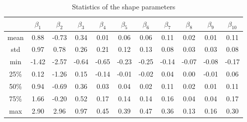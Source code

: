 \begin{table}[h]
    \centering
    \begin{tabular}{c | c c c c c c c c c c}
        \toprule
             & $\beta_1$ & $\beta_2$ & $\beta_3$ & $\beta_4$ & $\beta_5$ & $\beta_6$ & $\beta_7$ & $\beta_8$ & $\beta_9$ & $\beta_{10}$ \\
        \midrule
        mean & 0.88      & -0.73     & 0.34      & 0.01      & 0.06      & 0.06      & 0.11      & 0.02      & 0.01      & 0.11         \\

        std  & 0.97      & 0.78      & 0.26      & 0.21      & 0.12      & 0.13      & 0.08      & 0.03      & 0.03      & 0.08         \\

        min  & -1.42     & -2.57     & -0.64     & -0.65     & -0.23     & -0.25     & -0.14     & -0.07     & -0.08     &
        -0.17                                                                                                                           \\

        25\% & 0.12      & -1.26     & 0.15      & -0.14     & -0.01     & -0.02     & 0.04      & 0.00      & -0.01     & 0.06         \\

        50\% & 0.94      & -0.69     & 0.36      & 0.03      & 0.04      & 0.02      & 0.11      & 0.02      & 0.01      & 0.11         \\

        75\% & 1.66      & -0.20     & 0.52      & 0.17      & 0.14      & 0.14      & 0.16      & 0.04      & 0.04      & 0.17         \\

        max  & 2.90      & 2.96      & 0.97      & 0.45      & 0.39      & 0.47      & 0.36      & 0.13      & 0.16      & 0.30         \\
        \bottomrule
    \end{tabular}
    \caption{Statistics of the shape parameters}
\end{table}